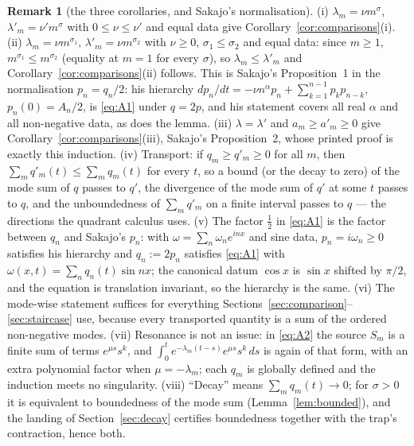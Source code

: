 \documentclass[11pt,a4paper]{article}
\theoremstyle{plain}
\theoremstyle{definition}
\newtheorem{remark}[theorem]{Remark}
\begin{document}
\begin{remark}[the three corollaries, and Sakajo's normalisation]\label{rem:sakajo}
(i) $\lambda_m=\nu m^\sigma$, $\lambda'_m=\nu'm^\sigma$ with $0\le\nu\le\nu'$ and equal data give Corollary~\ref{cor:comparisons}(i). (ii) $\lambda_m=\nu m^{\sigma_1}$, $\lambda'_m=\nu m^{\sigma_2}$ with $\nu\ge0$, $\sigma_1\le\sigma_2$ and equal data: since $m\ge1$, $m^{\sigma_1}\le m^{\sigma_2}$ (equality at $m=1$ for every $\sigma$), so $\lambda_m\le\lambda'_m$ and Corollary~\ref{cor:comparisons}(ii) follows. This is Sakajo's Proposition~1 in the normalisation $p_n=q_n/2$: his hierarchy $dp_n/dt=-\nu n^\alpha p_n+\sum_{k=1}^{n-1}p_kp_{n-k}$, $p_n(0)=A_n/2$, is \eqref{eq:A1} under $q=2p$, and his statement covers all real $\alpha$ and all non-negative data, as does the lemma. (iii) $\lambda=\lambda'$ and $a_m\ge a'_m\ge0$ give Corollary~\ref{cor:comparisons}(iii), Sakajo's Proposition~2, whose printed proof is exactly this induction. (iv) Transport: if $q_m\ge q'_m\ge0$ for all $m$, then $\sum_mq'_m(t)\le\sum_mq_m(t)$ for every $t$, so a bound (or the decay to zero) of the mode sum of $q$ passes to $q'$, the divergence of the mode sum of $q'$ at some $t$ passes to $q$, and the unboundedness of $\sum_mq'_m$ on a finite interval passes to $q$ --- the directions the quadrant calculus uses. (v) The factor $\tfrac12$ in \eqref{eq:A1} is the factor between $q_n$ and Sakajo's $p_n$: with $\omega=\sum_n\omega_ne^{inx}$ and sine data, $p_n=i\omega_n\ge0$ satisfies his hierarchy and $q_n:=2p_n$ satisfies \eqref{eq:A1} with $\omega(x,t)=\sum_nq_n(t)\sin nx$; the canonical datum $\cos x$ is $\sin x$ shifted by $\pi/2$, and the equation is translation invariant, so the hierarchy is the same. (vi) The mode-wise statement suffices for everything Sections~\ref{sec:comparison}--\ref{sec:staircase} use, because every transported quantity is a sum of the ordered non-negative modes. (vii) Resonance is not an issue: in \eqref{eq:A2} the source $S_m$ is a finite sum of terms $e^{\mu s}s^k$, and $\int_0^te^{-\lambda_m(t-s)}e^{\mu s}s^k\,ds$ is again of that form, with an extra polynomial factor when $\mu=-\lambda_m$; each $q_m$ is globally defined and the induction meets no singularity. (viii) ``Decay'' means $\sum_mq_m(t)\to0$; for $\sigma>0$ it is equivalent to boundedness of the mode sum (Lemma~\ref{lem:bounded}), and the landing of Section~\ref{sec:decay} certifies boundedness together with the trap's contraction, hence both.
\end{remark}
\end{document}

